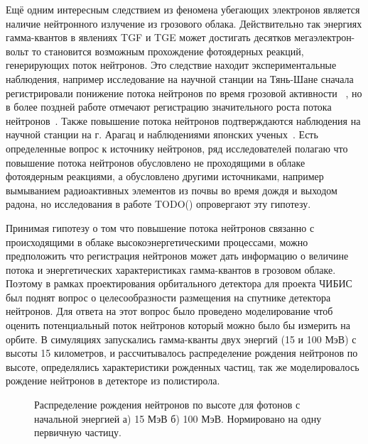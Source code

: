 Ещё одним интересным следствием из феномена убегающих электронов является наличие нейтронного излучение из грозового облака. Действительно так энергиях гамма-квантов в явлениях TGF и TGE может достигать десятков мегаэлектрон-вольт то становится возможным прохождение фотоядерных реакций, генерирующих поток нейтронов. Это следствие находит экспериментальные наблюдения, например исследование на научной станции на Тянь-Шане сначала регистрировали понижение потока нейтронов по время грозовой активности ~\cite{antonova2009effect}, но в более поздней работе отмечают регистрацию значительного роста потока нейтронов~\cite{gurevich2012strong}. Также повышение потока нейтронов подтверждаются наблюдения на научной станции на г. Арагац и наблюдениями японских ученых~\cite{enoto2017photonuclear}. Есть определенные вопрос к источнику нейтронов, ряд исследователей полагаю что повышение потока нейтронов обусловлено не проходящими в облаке фотоядерным реакциями, а обусловлено другими источниками, например вымыванием радиоактивных элементов из почвы во время дождя и выходом радона, но исследования в работе TODO() опровергают эту гипотезу.


Принимая гипотезу о том что повышение потока нейтронов связанно с происходящими в облаке высокоэнергетическими процессами, можно предположить что регистрация нейтронов может дать информацию о величине потока и энергетических характеристиках гамма-квантов в грозовом облаке. Поэтому в рамках проектирования орбитального детектора для проекта ЧИБИС был поднят вопрос о целесообразности размещения на спутнике детектора нейтронов. Для ответа на этот вопрос было проведено моделирование чтоб оценить потенциальный поток нейтронов который можно было бы измерить на орбите. В симуляциях запускались гамма-кванты двух энергий  (15 и 100 МэВ) с высоты 15 километров, и рассчитывалось распределение рождения нейтронов по высоте, определялись характеристики рожденных частиц, так же моделировалось рождение нейтронов в детекторе из полистирола. 

\begin{figure}[t]
    \begin{center}
        \begin{minipage}[h]{0.49\linewidth}
        \end{minipage}
        \hfill
        \begin{minipage}[h]{0.49\linewidth}
        \end{minipage}
        \caption{Распределение рождения нейтронов по высоте для фотонов с начальной энергией а) 15 МэВ б) 100 МэВ. Нормировано на одну первичную частицу.}
    \end{center}
    \label{fig:storm:neutron_z}
\end{figure}

